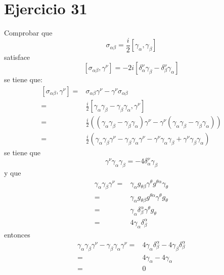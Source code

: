 \section*{Ejercicio 31}
Comprobar que 
\begin{equation*}
    \sigma_{\alpha \beta} = \frac{i}{2} \left[\gamma_\alpha , \gamma_\beta\right]
\end{equation*}
satisface
\begin{equation*}
    \left[\sigma_{\alpha \beta} , \gamma^\nu \right]=-2i \left[ \delta_\alpha^\nu \gamma_\beta - \delta_\beta^\nu \gamma_\alpha\right]
\end{equation*}
se tiene que:
\begin{align*}
    \left[\sigma_{\alpha \beta} , \gamma^\nu \right] =& \sigma_{\alpha \beta} \gamma^\nu - \gamma^\nu \sigma_{\alpha \beta} \\
    =& \frac{i}{2} \left[\gamma_\alpha \gamma_\beta - \gamma_\beta \gamma_\alpha , \gamma^\nu \right] \\
    =& \frac{i}{2} \left(\left(\gamma_\alpha \gamma_\beta - \gamma_\beta \gamma_\alpha  \right)\gamma^\nu - \gamma^\nu \left(\gamma_\alpha \gamma_\beta - \gamma_\beta \gamma_\alpha\right)\right)\\
    =& \frac{i}{2} \left(\gamma_\alpha \gamma_\beta \gamma^\nu- \gamma_\beta \gamma_\alpha\gamma^\nu - \gamma^\nu \gamma_\alpha \gamma_\beta + \gamma^\nu\gamma_\beta \gamma_\alpha\right)
\end{align*}
se tiene que 
\begin{equation*}
    \gamma^\nu \gamma_\alpha \gamma_\beta = -4\delta_\alpha^\nu \gamma_\beta 
\end{equation*}
y que
\begin{align*}
    \gamma_\alpha \gamma_\beta \gamma^\nu =& \gamma_\alpha g_{\theta \beta} \gamma^{\theta} g^{\theta \alpha }  \gamma_{\theta}\\
    =& \gamma_\alpha g_{\theta \beta} g^{\theta \alpha} \gamma^{\theta} g_{\theta} \\
    =& \gamma_\alpha \delta_{\beta}^\alpha \gamma^{\theta} g_{\theta} \\ 
    =& 4\gamma_\alpha \delta_{\beta}^\alpha
\end{align*}
entonces
\begin{align*}
    \gamma_\alpha \gamma_\beta \gamma^\nu - \gamma_\beta \gamma_\alpha \gamma^\nu =& 4\gamma_\alpha \delta_{\beta}^\alpha - 4\gamma_\beta \delta_{\beta}^\alpha \\
    =& 4\gamma_\alpha - 4\gamma_\alpha \\
    =& 0
\end{align*}
